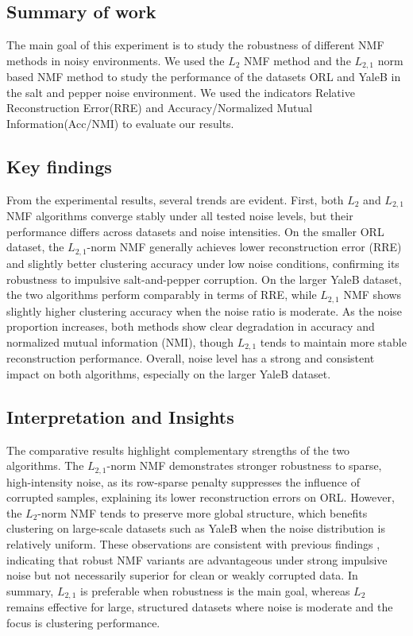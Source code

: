 \subsection{Summary of work}

The main goal of this experiment is to study the robustness of different NMF methods in noisy environments. We used the $L_2$ NMF method and the $L_{2,1}$ norm based NMF method to study the performance of the datasets ORL and YaleB in the salt and pepper noise environment. We used the indicators Relative Reconstruction Error(RRE) and Accuracy/Normalized Mutual Information(Acc/NMI) to evaluate our results.

\subsection{Key findings}

From the experimental results, several trends are evident. 
First, both $L_2$ and $L_{2,1}$ NMF algorithms converge stably under all tested noise levels, but their performance differs across datasets and noise intensities. 
On the smaller ORL dataset, the $L_{2,1}$-norm NMF generally achieves lower reconstruction error (RRE) and slightly better clustering accuracy under low noise conditions, confirming its robustness to impulsive salt-and-pepper corruption. 
On the larger YaleB dataset, the two algorithms perform comparably in terms of RRE, while $L_{2,1}$ NMF shows slightly higher clustering accuracy when the noise ratio is moderate. 
As the noise proportion increases, both methods show clear degradation in accuracy and normalized mutual information (NMI), though $L_{2,1}$ tends to maintain more stable reconstruction performance. 
Overall, noise level has a strong and consistent impact on both algorithms, especially on the larger YaleB dataset.

\subsection{Interpretation and Insights}

The comparative results highlight complementary strengths of the two algorithms. 
The $L_{2,1}$-norm NMF demonstrates stronger robustness to sparse, high-intensity noise, as its row-sparse penalty suppresses the influence of corrupted samples, explaining its lower reconstruction errors on ORL. 
However, the $L_2$-norm NMF tends to preserve more global structure, which benefits clustering on large-scale datasets such as YaleB when the noise distribution is relatively uniform. 
These observations are consistent with previous findings \cite{Zeng2023RobustnessThreeNMF, Shen2022AdaptiveWeightedNMF, Liu2022RLNMF_AG}, indicating that robust NMF variants are advantageous under strong impulsive noise but not necessarily superior for clean or weakly corrupted data. 
In summary, $L_{2,1}$ is preferable when robustness is the main goal, whereas $L_2$ remains effective for large, structured datasets where noise is moderate and the focus is clustering performance.

